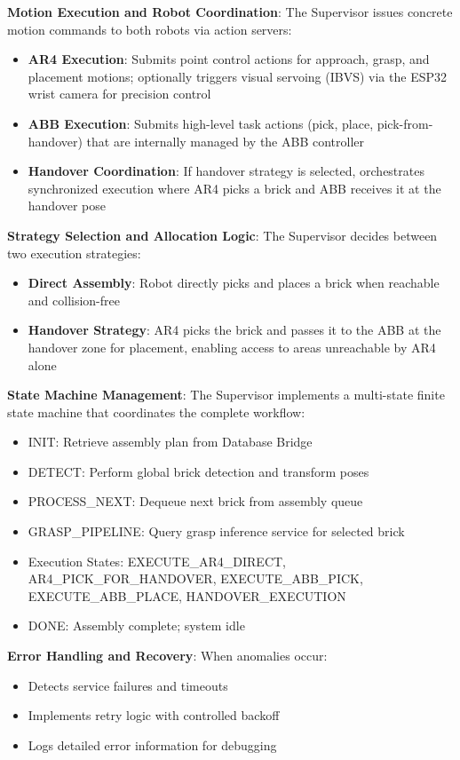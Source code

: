 \textbf{Motion Execution and Robot Coordination}: The Supervisor issues concrete motion commands to both robots via action servers:
\begin{itemize}
    \item \textbf{AR4 Execution}: Submits point control actions for approach, grasp, and placement motions; optionally triggers visual servoing (IBVS) via the ESP32 wrist camera for precision control
    \item \textbf{ABB Execution}: Submits high-level task actions (pick, place, pick-from-handover) that are internally managed by the ABB controller
    \item \textbf{Handover Coordination}: If handover strategy is selected, orchestrates synchronized execution where AR4 picks a brick and ABB receives it at the handover pose
\end{itemize}

\textbf{Strategy Selection and Allocation Logic}: The Supervisor decides between two execution strategies:
\begin{itemize}
    \item \textbf{Direct Assembly}: Robot directly picks and places a brick when reachable and collision-free
    \item \textbf{Handover Strategy}: AR4 picks the brick and passes it to the ABB at the handover zone for placement, enabling access to areas unreachable by AR4 alone
\end{itemize}

\textbf{State Machine Management}: The Supervisor implements a multi-state finite state machine that coordinates the complete workflow:
\begin{itemize}
    \item INIT: Retrieve assembly plan from Database Bridge
    \item DETECT: Perform global brick detection and transform poses
    \item PROCESS\_NEXT: Dequeue next brick from assembly queue
    \item GRASP\_PIPELINE: Query grasp inference service for selected brick
    \item Execution States: EXECUTE\_AR4\_DIRECT, AR4\_PICK\_FOR\_HANDOVER, EXECUTE\_ABB\_PICK, EXECUTE\_ABB\_PLACE, HANDOVER\_EXECUTION
    \item DONE: Assembly complete; system idle
\end{itemize}

\textbf{Error Handling and Recovery}: When anomalies occur:
\begin{itemize}
    \item Detects service failures and timeouts
    \item Implements retry logic with controlled backoff
    \item Logs detailed error information for debugging
\end{itemize}

